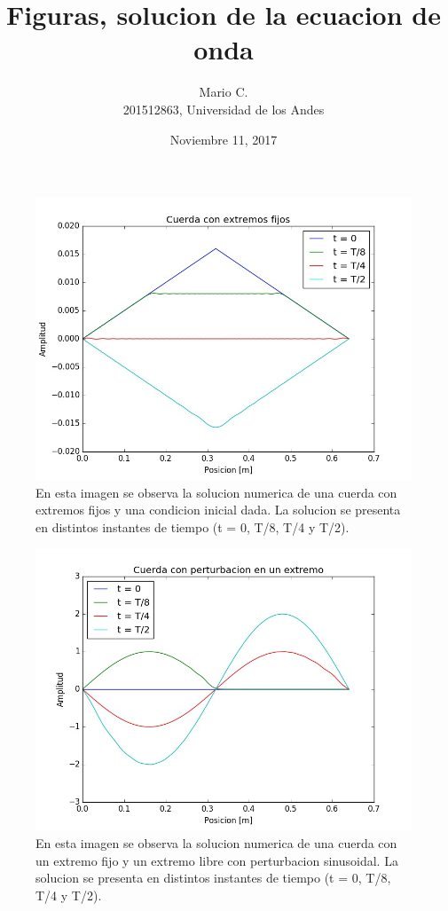 \documentclass{article}
\begin{document}
\begin{center}

  \title{Figuras, solucion de la ecuacion de onda}
\date{Noviembre 11, 2017}
\author{Mario C.\\ 201512863, Universidad de los Andes}
\maketitle
  
  \begin{figure}[t]
    \includegraphics[width=\textwidth]{extremos_fijos}
    \centering
    \\
    En esta imagen se observa la solucion numerica de una cuerda con extremos fijos y una condicion inicial dada. La solucion se presenta en distintos instantes de tiempo (t = 0, T/8, T/4 y T/2).
  \end{figure}
  

  \begin{figure}[t]
    \includegraphics[width=\textwidth]{extremos_perturbacion}
    \centering
    \\
     En esta imagen se observa la solucion numerica de una cuerda con un extremo fijo y un extremo libre con perturbacion sinusoidal. La solucion se presenta en distintos instantes de tiempo (t = 0, T/8, T/4 y T/2).
  \end{figure}


\end{center}
\end{document}
